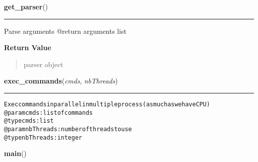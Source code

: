 \hspace{.8\funcindent}\begin{boxedminipage}{\funcwidth}

    \raggedright \textbf{get\_parser}()

    \vspace{-1.5ex}

    \rule{\textwidth}{0.5\fboxrule}
\setlength{\parskip}{2ex}
    Parse arguments @return arguments list

\setlength{\parskip}{1ex}
      \textbf{Return Value}
    \vspace{-1ex}

      \begin{quote}
      parser object

      \end{quote}

    \end{boxedminipage}

    \label{script-iVCFmerge:exec_commands}

    \vspace{0.5ex}

\hspace{.8\funcindent}\begin{boxedminipage}{\funcwidth}

    \raggedright \textbf{exec\_commands}(\textit{cmds}, \textit{nbThreads})

    \vspace{-1.5ex}

    \rule{\textwidth}{0.5\fboxrule}
\setlength{\parskip}{2ex}
\begin{alltt}

Exec commands in parallel in multiple process (as much as we have CPU)
@param cmds: list of commands
    @type cmds: list
    @param nbThreads: number of threads to use
    @type nbThreads: integer
\end{alltt}

\setlength{\parskip}{1ex}
    \end{boxedminipage}

    \label{script-iVCFmerge:main}

    \vspace{0.5ex}

\hspace{.8\funcindent}\begin{boxedminipage}{\funcwidth}

    \raggedright \textbf{main}()

\setlength{\parskip}{2ex}
\setlength{\parskip}{1ex}
    \end{boxedminipage}


